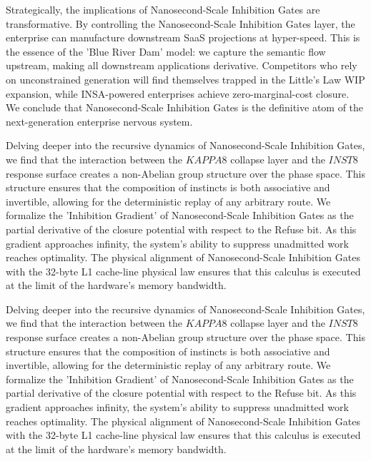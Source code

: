 \documentclass[12pt,a4paper,oneside]{book}
\begin{document}
Strategically, the implications of Nanosecond-Scale Inhibition Gates are transformative. By controlling the Nanosecond-Scale Inhibition Gates layer, the enterprise can manufacture downstream SaaS projections at hyper-speed. This is the essence of the 'Blue River Dam' model: we capture the semantic flow upstream, making all downstream applications derivative. Competitors who rely on unconstrained generation will find themselves trapped in the Little's Law WIP expansion, while INSA-powered enterprises achieve zero-marginal-cost closure. We conclude that Nanosecond-Scale Inhibition Gates is the definitive atom of the next-generation enterprise nervous system. 

Delving deeper into the recursive dynamics of Nanosecond-Scale Inhibition Gates, we find that the interaction between the $KAPPA8$ collapse layer and the $INST8$ response surface creates a non-Abelian group structure over the phase space. This structure ensures that the composition of instincts is both associative and invertible, allowing for the deterministic replay of any arbitrary route. We formalize the 'Inhibition Gradient' of Nanosecond-Scale Inhibition Gates as the partial derivative of the closure potential with respect to the Refuse bit. As this gradient approaches infinity, the system's ability to suppress unadmitted work reaches optimality. The physical alignment of Nanosecond-Scale Inhibition Gates with the 32-byte L1 cache-line physical law ensures that this calculus is executed at the limit of the hardware's memory bandwidth. 

Delving deeper into the recursive dynamics of Nanosecond-Scale Inhibition Gates, we find that the interaction between the $KAPPA8$ collapse layer and the $INST8$ response surface creates a non-Abelian group structure over the phase space. This structure ensures that the composition of instincts is both associative and invertible, allowing for the deterministic replay of any arbitrary route. We formalize the 'Inhibition Gradient' of Nanosecond-Scale Inhibition Gates as the partial derivative of the closure potential with respect to the Refuse bit. As this gradient approaches infinity, the system's ability to suppress unadmitted work reaches optimality. The physical alignment of Nanosecond-Scale Inhibition Gates with the 32-byte L1 cache-line physical law ensures that this calculus is executed at the limit of the hardware's memory bandwidth. 
\end{document}
